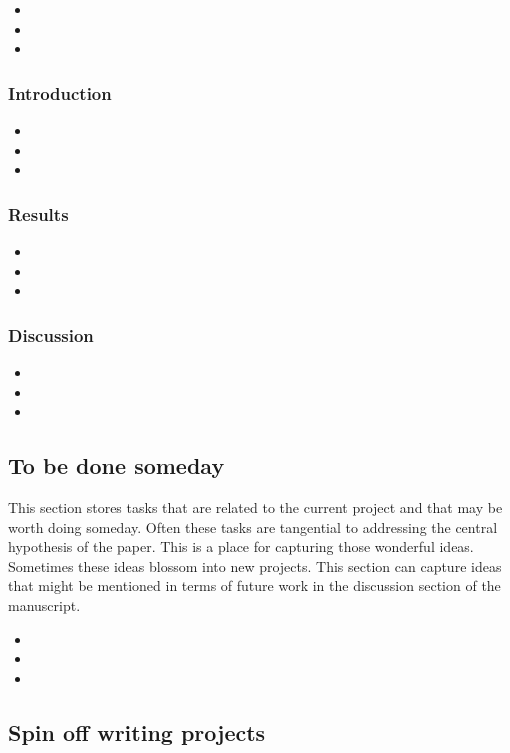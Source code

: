 \documentclass[10pt,letterpaper]{article}
\newcommand{\bi}{\begin{itemize}}
\newcommand{\ei}{\end{itemize}}
\begin{document}
\bi
    \item  
    \item  
    \item  
\ei


\subsubsection{Introduction}
\label{ssubsec:new-ideas:Intro}


\bi
    \item  
    \item  
    \item  
\ei

\subsubsection{Results}
\label{ssubsec:new-ideas:Results}

\bi
    \item  
    \item  
    \item  
\ei

\subsubsection{Discussion}
\label{ssubsec:new-ideas:Discussion}

\bi
    \item  
    \item  
    \item  
\ei

\subsection{To be done someday}
\label{subsec:someday}

This section stores tasks that are related to the current project and that may be worth doing someday.
Often these tasks are tangential to addressing the central hypothesis of the paper.
This is a place for capturing those wonderful ideas.
Sometimes these ideas blossom into new projects.
This section can capture ideas that might be mentioned in terms of future work in the discussion section of the manuscript.


\bi
    \item  
    \item  
    \item  
\ei

\subsection{Spin off writing projects}
\label{subsec:spinoffs}
\end{document}

